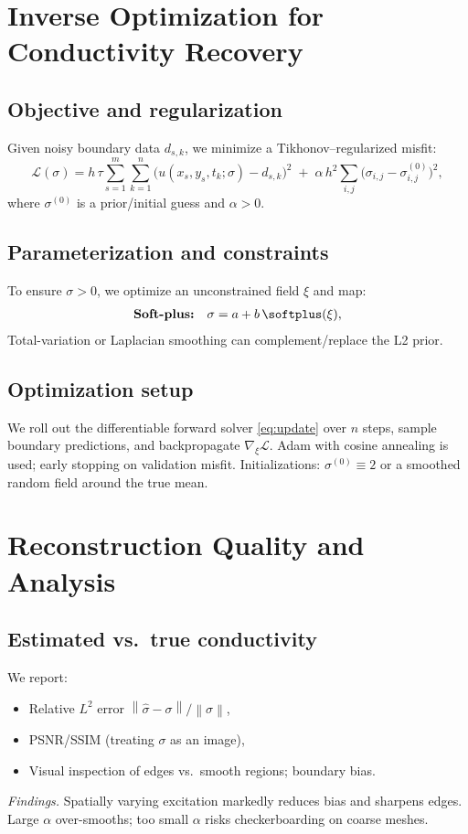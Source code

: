\documentclass[11pt,a4paper]{article}
\numberwithin{equation}{section}
\newcommand{\norm}[1]{\left\lVert #1 \right\rVert}
\begin{document}
\section{Inverse Optimization for Conductivity Recovery}
\label{sec:inverse}

\subsection{Objective and regularization}
Given noisy boundary data $d_{s,k}$, we minimize a Tikhonov--regularized misfit:
\begin{equation}
  \mathcal{L}(\sigma)
  = h\,\tau \sum_{s=1}^{m}\sum_{k=1}^{n}\Big(u(x_s,y_s,t_k;\sigma)-d_{s,k}\Big)^2
  \;+\;
  \alpha\,h^2 \sum_{i,j}\Big(\sigma_{i,j}-\sigma^{(0)}_{i,j}\Big)^2,
  \label{eq:loss}
\end{equation}
where $\sigma^{(0)}$ is a prior/initial guess and $\alpha>0$.

\subsection{Parameterization and constraints}
To ensure $\sigma>0$, we optimize an unconstrained field $\xi$ and map:
\begin{align}
  \textbf{Soft-plus:}\quad & \sigma = a + b\,\softplus(\xi), \\
\end{align}
Total-variation or Laplacian smoothing can complement/replace the L2 prior.

\subsection{Optimization setup}
We roll out the differentiable forward solver \eqref{eq:update} over $n$ steps, sample boundary predictions, and backpropagate $\nabla_\xi\mathcal{L}$.
Adam with cosine annealing is used; early stopping on validation misfit.
Initializations: $\sigma^{(0)}\equiv 2$ or a smoothed random field around the true mean.

\section{Reconstruction Quality and Analysis}
\label{sec:analysis}

\subsection{Estimated vs.\ true conductivity}
We report:
\begin{itemize}[leftmargin=1.25em]
  \item Relative $L^2$ error $\norm{\hat\sigma-\sigma}/\norm{\sigma}$,
  \item PSNR/SSIM (treating $\sigma$ as an image),
  \item Visual inspection of edges vs.\ smooth regions; boundary bias.
\end{itemize}
\textit{Findings.} Spatially varying excitation markedly reduces bias and sharpens edges. 
Large $\alpha$ over-smooths; too small $\alpha$ risks checkerboarding on coarse meshes.
\end{document}
